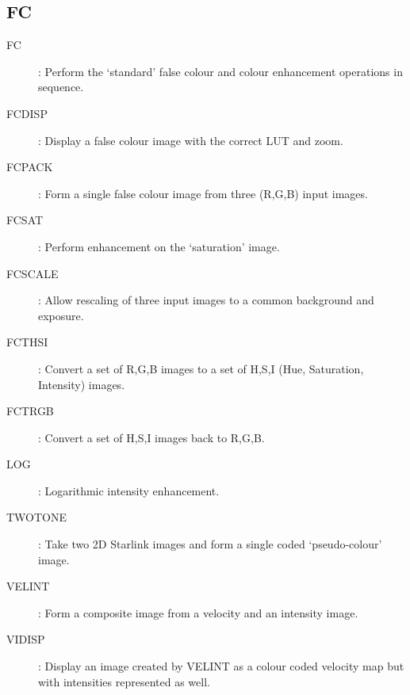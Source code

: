 \subsection {FC}
\begin{description}
\begin{description}
\item [FC]: Perform the `standard' false colour and colour enhancement
operations in sequence.
\item [FCDISP]: Display a false colour image with the correct LUT and zoom.
\item [FCPACK]: Form a single false colour image from three (R,G,B) input
images.
\item [FCSAT]: Perform enhancement on the `saturation' image.
\item [FCSCALE]: Allow rescaling of three input images to a common background
and exposure.
\item [FCTHSI]: Convert a set of R,G,B images to a set of H,S,I (Hue,
Saturation, Intensity) images.
\item [FCTRGB]: Convert a set of H,S,I images back to R,G,B.
\item [LOG]: Logarithmic intensity enhancement.
\item [TWOTONE]: Take two 2D Starlink images and form a single coded
`pseudo-colour' image.
\item [VELINT]: Form a composite image from a velocity and an intensity image.
\item [VIDISP]: Display an image created by VELINT as a colour coded velocity
map but with intensities represented as well.
\end{description}
\end{description}
